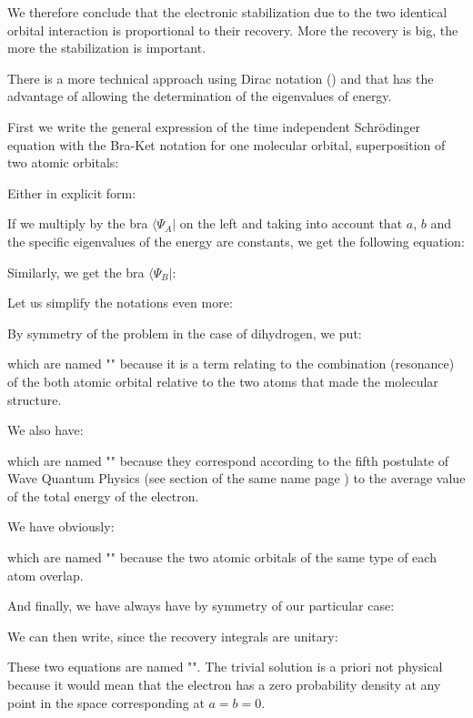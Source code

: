 	We therefore conclude that the electronic stabilization due to the two identical orbital interaction is proportional to their recovery. More the recovery is big, the more the stabilization is important.
	
	There is a more technical approach using Dirac notation () and that has the advantage of allowing the determination of the eigenvalues of energy.

	First we write the general expression of the time independent Schrödinger equation with the Bra-Ket notation for one molecular orbital, superposition of two atomic orbitals:
	
	Either in explicit form:
	
	If we multiply by the bra $\langle \Psi_A|$  on the left and taking into account that $a$, $b$ and the specific eigenvalues of the energy are constants, we get the following equation:
	
	Similarly, we get the bra $\langle \Psi_B|$:
	
	Let us simplify the notations even more:
	
	By symmetry of the problem in the case of dihydrogen, we put:
	
	which are named "" because it is a term relating to the combination (resonance) of the both atomic orbital relative to the two atoms that made the molecular structure.

	We also have:
	
	which are named "" because they correspond according to the fifth postulate of Wave Quantum Physics (see section of the same name page \pageref{fifth postulate of wave quantum physics}) to the average value of the total energy of the electron.

	We have obviously:
	
	which are named "" because the two atomic orbitals of the same type of each atom overlap.
	
	And finally, we have always have by symmetry of our particular case:
	
	We can then write, since the recovery integrals are unitary:
	
	These two equations are named "". The trivial solution is a priori not physical because it would mean that the electron has a zero probability density at any point in the space corresponding at $a=b=0$.

